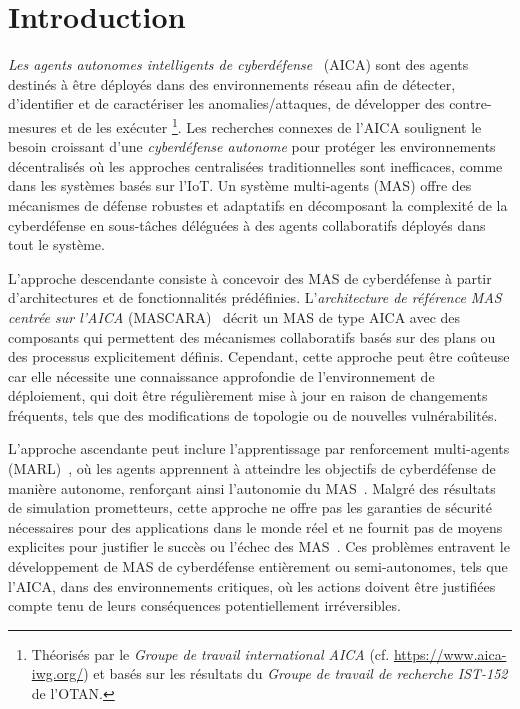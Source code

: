



\section{Introduction}
\label{sec:introduction}

\textit{Les agents autonomes intelligents de cyberdéfense}~\cite{Kott2023} (AICA) sont des agents destinés à être déployés dans des environnements réseau afin de détecter, d'identifier et de caractériser les anomalies/attaques, de développer des contre-mesures et de les exécuter
%
\footnote{
    Théorisés par le \textit{Groupe de travail international AICA} (cf. \url{https://www.aica-iwg.org/}) et basés sur les résultats du \textit{Groupe de travail de recherche IST-152} de l'OTAN.
}.
Les recherches connexes de l'AICA soulignent le besoin croissant d'une \textit{cyberdéfense autonome} pour protéger les environnements décentralisés où les approches centralisées traditionnelles sont inefficaces, comme dans les systèmes basés sur l'IoT. Un système multi-agents (MAS) offre des mécanismes de défense robustes et adaptatifs en décomposant la complexité de la cyberdéfense en sous-tâches déléguées à des agents collaboratifs déployés dans tout le système.

L'approche descendante consiste à concevoir des MAS de cyberdéfense à partir d'architectures et de fonctionnalités prédéfinies. L'\textit{architecture de référence MAS centrée sur l'AICA} (MASCARA)~\cite{Kott2023} décrit un MAS de type AICA avec des composants qui permettent des mécanismes collaboratifs basés sur des plans ou des processus explicitement définis. Cependant, cette approche peut être coûteuse car elle nécessite une connaissance approfondie de l'environnement de déploiement, qui doit être régulièrement mise à jour en raison de changements fréquents, tels que des modifications de topologie ou de nouvelles vulnérabilités.

L'approche ascendante peut inclure l'apprentissage par renforcement multi-agents (MARL)~\cite{Albrecht2024}, où les agents apprennent à atteindre les objectifs de cyberdéfense de manière autonome, renforçant ainsi l'autonomie du MAS~\cite{hammar_stadle4_noms_23}. Malgré des résultats de simulation prometteurs, cette approche ne offre pas les garanties de sécurité nécessaires pour des applications dans le monde réel et ne fournit pas de moyens explicites pour justifier le succès ou l'échec des MAS~\cite{dulacarnold2019}. Ces problèmes entravent le développement de MAS de cyberdéfense entièrement ou semi-autonomes, tels que l'AICA, dans des environnements critiques, où les actions doivent être justifiées compte tenu de leurs conséquences potentiellement irréversibles.

